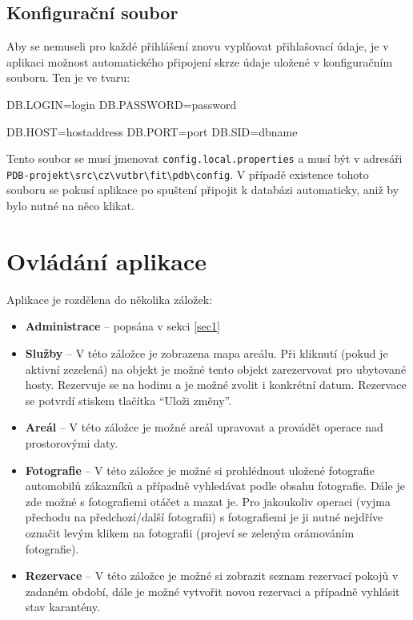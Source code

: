 \documentclass[11pt,a4paper]{article}
\begin{document}
 \subsection{Konfigurační soubor}\label{conf}
 Aby se nemuseli pro každé přihlášení znovu vyplňovat přihlašovací údaje, je v aplikaci možnost automatického připojení skrze údaje uložené v konfiguračním souboru. Ten je ve tvaru:
 \begin{center}
\begin{boxedverbatim}
DB.LOGIN=login
DB.PASSWORD=password

DB.HOST=hostaddress
DB.PORT=port
DB.SID=dbname
\end{boxedverbatim}
\end{center}
Tento soubor se musí jmenovat \texttt{config.local.properties} a musí být v adresáři \verb;PDB-projekt\src\cz\vutbr\fit\pdb\config;. V případě existence tohoto souboru se pokusí aplikace po spuštení připojit k databázi automaticky, aniž by bylo nutné na něco klikat.

\section{Ovládání aplikace}
Aplikace je rozdělena do několika záložek: 
\begin{itemize}
\item \textbf{Administrace} -- popsána v sekci \ref{sec1}
\item \textbf{Služby} -- V této záložce je zobrazena mapa areálu. Při kliknutí (pokud je aktivní zezelená) na objekt je možné tento objekt zarezervovat pro ubytované hosty. Rezervuje se na hodinu a je možné zvolit i konkrétní datum. Rezervace se potvrdí stiskem tlačítka ``Uloži změny''.
\item \textbf{Areál} -- V této záložce je možné areál upravovat a provádět operace nad prostorovými daty.
\item \textbf{Fotografie} -- V této záložce je možné si prohlédnout uložené fotografie automobilů zákazníků a případně vyhledávat podle obsahu fotografie. Dále je zde možné s fotografiemi otáčet a mazat je. Pro jakoukoliv operaci (vyjma přechodu na předchozí/další fotografii) s fotografiemi je ji nutné nejdříve označit levým klikem na fotografii (projeví se zeleným orámováním fotografie).
\item \textbf{Rezervace} -- V této záložce je možné si zobrazit seznam rezervací pokojů v zadaném období, dále je možné vytvořit novou rezervaci a případně vyhlásit stav karantény.
\end{itemize}
\end{document}
